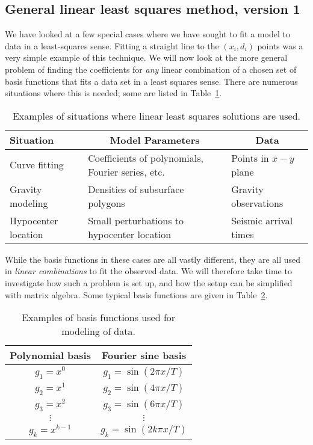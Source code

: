 \subsection{General linear least squares method, version 1}

	We have looked at a few special cases where we have sought to fit a model to data in a 
least-squares sense.  Fitting a straight line to the $(x_i, d_i)$ points was a very simple example of this 
technique. We will now look at the more general problem of finding the coefficients for \emph{any} 
linear combination of a chosen set of basis functions that fits a data set in a least squares sense. There are 
numerous situations where this is needed; some are listed in Table~\ref{tbl:LLS_examples}.

\begin{table}[h]
\centering
\begin{tabular}{|l|p{1.5in}|l|}
\hline
\bf{Situation}  & \multicolumn{1}{c|}{\bf{Model Parameters}} & \multicolumn{1}{c|}{\bf{Data}} \\ \hline
Curve fitting & 
Coefficients of polynomials, Fourier series, etc. &
Points in $x-y$ plane \\ \hline
Gravity modeling &
Densities of subsurface polygons & 
Gravity observations\\ \hline
Hypocenter location & 
Small perturbations to hypocenter location & Seismic arrival times \\ \hline
\end{tabular}
\caption{Examples of situations where linear least squares solutions are used.}
\label{tbl:LLS_examples}
\end{table}

While the basis functions in these cases are all vastly different, they are all used in 
\emph{linear combinations} to fit the observed data. We will therefore take time to investigate how such a 
problem is set up, and how the setup can be simplified with matrix algebra.
Some typical basis functions are given in Table~\ref{tbl:basis_funcs}.

\begin{table}[h]
\centering
\begin{tabular}{|c|c|}
\hline
\bf{Polynomial basis} & \bf{Fourier sine basis}\\ \hline
$g_1=x^0$  & $g_1=\sin(2\pi x/T)$\\ \hline
$g_2=x^1$  & $g_2=\sin(4\pi x/T)$\\ \hline
$g_3=x^2$  & $g_3=\sin(6\pi x/T)$\\ \hline
$\vdots$ & $\vdots$\\ \hline
$g_k=x^{k-1}$  & $g_k=\sin(2k\pi x/T)$ \\ \hline
\end{tabular}
\caption{Examples of basis functions used for modeling of data.}
\label{tbl:basis_funcs}
\end{table}


